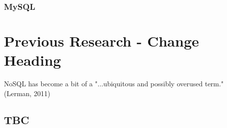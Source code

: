 \subsubsection{MySQL}\label{mysql}

\section{Previous Research - Change Heading}
NoSQL has become a bit of a "...ubiquitous and possibly overused term." (Lerman, 2011)
\subsection{TBC}